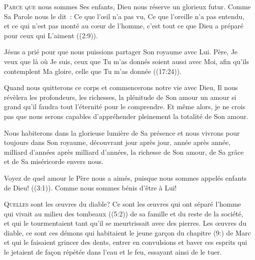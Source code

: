 \lettrine{P}{arce que} nous sommes Ses enfants,
 Dieu nous réserve un glorieux futur.
 Comme Sa Parole nous le dit~: 
 \og Ce que l'\oe{}il n'a pas vu, Ce que l'oreille n'a pas entendu,
 et ce qui n'est pas monté au c\oe{}ur de l'homme,
 c'est tout ce que Dieu a préparé pour ceux qui L'aiment \fg{}
 ((2:9)). 

Jésus a prié pour que nous puissions partager Son royaume avec Lui.
 \og Père, Je veux que là où Je suis, ceux que Tu m'as donnés
 soient aussi avec Moi, afin qu'ils contemplent Ma gloire,
 celle que Tu m'as donnée \fg{} ((17:24)). 


Quand nous quitterons ce corps et commencerons notre vie avec Dieu,
 Il nous révèlera les profondeurs, les richesses, la plénitude de Son amour
 \ocadr un amour si grand qu'il faudra tout l'éternité pour le comprendre.
 Et même alors, je ne crois pas que nous serons capables d'appréhender
 pleinement la totalité de Son amour. 

Nous habiterons dans la glorieuse lumière de Sa présence et nous vivrons
 pour toujours dans Son royaume, découvrant jour après jour,
 année après année, milliard d'années après milliard d'années,
 la richesse de Son amour, de Sa grâce et de Sa miséricorde envers nous. 

\og Voyez de quel amour le Père nous a aimés, puisque nous sommes appelés
 enfants de Dieu! \fg{} ((3:1)).
 Comme nous sommes bénis d'être à Lui! 

\dvrule






\lettrine{Q}{uelles} sont les \oe{}uvres du diable?
 Ce sont les \oe{}uvres qui ont séparé l'homme qui vivait
 au milieu des tombeaux ((5:2)) de sa famille
 et du reste de la société, et qui le tourmentaient tant
 qu'il se meurtrissait avec des pierres.
 Les \oe{}uvres du diable, ce sont ces démons qui habitaient le jeune garçon
 du chapitre (9:) de Marc et qui le faisaient grincer des dents,
 entrer en convulsions et baver \ocadr ces esprits qui le jetaient
 de façon répétée dans l'eau et le feu, essayant ainsi de le tuer. 

